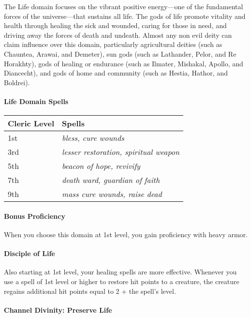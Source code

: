 \documentclass[
]{article}
\begin{document}
The Life domain focuses on the vibrant positive energy---one of the
fundamental forces of the universe---that sustains all life. The gods of
life promote vitality and health through healing the sick and wounded,
caring for those in need, and driving away the forces of death and
undeath. Almost any non evil deity can claim influence over this domain,
particularly agricultural deities (such as Chauntea, Arawai, and
Demeter), sun gods (such as Lathander, Pelor, and Re Horakhty), gods of
healing or endurance (such as Ilmater, Mishakal, Apollo, and Diancecht),
and gods of home and community (such as Hestia, Hathor, and Boldrei).

\hypertarget{life-domain-spells}{%
\paragraph{Life Domain Spells}\label{life-domain-spells}}

\begin{longtable}[]{@{}ll@{}}
\toprule
Cleric Level & Spells\tabularnewline
\midrule
\endhead
1st & \emph{bless, cure wounds}\tabularnewline
3rd & \emph{lesser restoration, spiritual weapon}\tabularnewline
5th & \emph{beacon of hope, revivify}\tabularnewline
7th & \emph{death ward, guardian of faith}\tabularnewline
9th & \emph{mass cure wounds, raise dead}\tabularnewline
\bottomrule
\end{longtable}

\hypertarget{bonus-proficiency}{%
\paragraph{Bonus Proficiency}\label{bonus-proficiency}}

When you choose this domain at 1st level, you gain proficiency with
heavy armor.

\hypertarget{disciple-of-life}{%
\paragraph{Disciple of Life}\label{disciple-of-life}}

Also starting at 1st level, your healing spells are more effective.
Whenever you use a spell of 1st level or higher to restore hit points to
a creature, the creature regains additional hit points equal to 2 + the
spell's level.

\hypertarget{channel-divinity-preserve-life}{%
\paragraph{Channel Divinity: Preserve
Life}\label{channel-divinity-preserve-life}}
\end{document}
